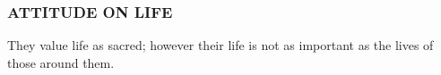 \subsubsection{ATTITUDE ON LIFE}
They value life as sacred; however their life is not as important as the lives
of those around them.
